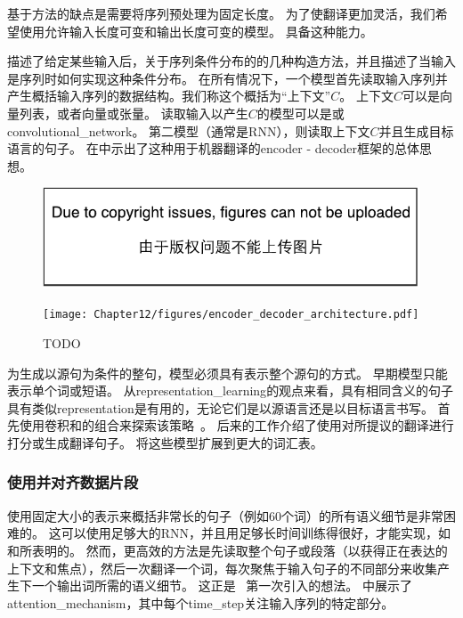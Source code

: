 基于方法的缺点是需要将序列预处理为固定长度。
为了使翻译更加灵活，我们希望使用允许输入长度可变和输出长度可变的模型。
具备这种能力。

描述了给定某些输入后，关于序列条件分布的的几种构造方法，并且描述了当输入是序列时如何实现这种条件分布。
在所有情况下，一个模型首先读取输入序列并产生概括输入序列的数据结构。我们称这个概括为``上下文''$C$。
上下文$C$可以是向量列表，或者向量或张量。
读取输入以产生$C$的模型可以是\citep{Cho-et-al-EMNLP2014,Sutskever-et-al-NIPS2014,Jean-et-al-arxiv2014}或\gls{convolutional_network}\citep{Kalchbrenner+Blunsom-EMNLP2013}。
第二模型（通常是RNN），则读取上下文$C$并且生成目标语言的句子。
在中示出了这种用于机器翻译的\gls{encoder} - \gls{decoder}框架的总体思想。


\begin{figure}[htp]
\ifOpenSource
\centerline{\includegraphics{figure.pdf}}
\else
\centerline{\texttt{[image: Chapter12/figures/encoder\_decoder\_architecture.pdf]}}
\fi
\caption{TODO}
\label{fig:chap12_encoder_decoder_architecture}
\end{figure}

为生成以源句为条件的整句，模型必须具有表示整个源句的方式。 
早期模型只能表示单个词或短语。
从\gls{representation_learning}的观点来看，具有相同含义的句子具有类似\gls{representation}是有用的，无论它们是以源语言还是以目标语言书写。
首先使用卷积和的组合来探索该策略~\citep{Kalchbrenner+Blunsom-EMNLP2013}。
后来的工作介绍了使用对所提议的翻译进行打分\citep{Cho-et-al-EMNLP2014}或生成翻译句子\citep{Sutskever-et-al-NIPS2014}。
\cite{Jean-et-al-arxiv2014} 将这些模型扩展到更大的词汇表。


\subsubsection{使用并对齐数据片段}
\label{sec:using_an_attention_mechanism_and_aligning_pieces_of_data}
 使用固定大小的表示来概括非常长的句子（例如60个词）的所有语义细节是非常困难的。 
 这可以使用足够大的RNN，并且用足够长时间训练得很好，才能实现，如 \citet{Cho-et-al-EMNLP2014}和\citet{Sutskever-et-al-NIPS2014}所表明的。
 然而，更高效的方法是先读取整个句子或段落（以获得正在表达的上下文和焦点），然后一次翻译一个词，每次聚焦于输入句子的不同部分来收集产生下一个输出词所需的语义细节。
 这正是~\citet{Bahdanau-et-al-ICLR2015-small} 第一次引入的想法。
 中展示了\gls{attention_mechanism}，其中每个\gls{time_step}关注输入序列的特定部分。

